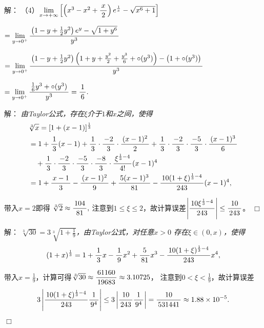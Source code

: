 \begin{frame}
	\linespread{1.5}
	\pause
	
	
	\small 解：
	（4）$\limx{+\infty}\left[\left(x^3-x^2+\df{x}2\right)e^{\frac1x}
	-\sqrt{x^6+1}\right]$
	
	\quad$=\lim\limits_{y\to0^+}\df{\left(1-y+\frac12y^2
	\right)e^y-\sqrt{1+y^6}}{y^3}$
	
	\quad$=\lim\limits_{y\to0^+}\df{\left(1-y+\frac12y^2
	\right)\left(1+y+\frac{y^2}2+\frac{y^3}6+\circ(y^3)\right)
	-\left(1+\circ(y^3)\right)}{y^3}$
	
	\quad$=\lim\limits_{y\to0^+}\df{\frac16y^3+\circ(y^3)}{y^3}=\df16.$
\end{frame}

\begin{frame}
	\linespread{1.5}
	\pause
	
	\bigskip
	
	\small 解：\it 
	由Taylor公式，存在$\xi$介于$1$和$x$之间，使得
	\begin{align*}
		&\sqrt[3]x=[1+(x-1)]^{\frac13}\\
		&=1+\df13(x-1)
		+\df13\cdot\df{-2}3\cdot\df{(x-1)^2}2
		+\df13\cdot\df{-2}3\cdot\df{-5}3\cdot\df{(x-1)^3}6\\
		&\quad+\df13\cdot\df{-2}3\cdot\df{-5}3\cdot\df{-8}3
		\cdot\df{\xi^{\frac13-4}}{4!}(x-1)^4\\
		&=1+\df{x-1}3-\df{(x-1)^2}9+\df{5(x-1)^3}{81}
		-\df{10(1+\xi)^{\frac13-4}}{243}(x-1)^4,
	\end{align*}
	
	\pause
	
	带入$x=2$即得
	$\sqrt[3]2\approx\df{104}{81},$
	注意到$1\leq\xi\leq 2$，故计算误差$\left|\df{10\xi^{\frac13-4}}{243}\right|
	\leq\df{10}{243}$。
	\hfill$\Box$
\end{frame}

\begin{frame}
	\linespread{1.5}
	\pause
	
	\bigskip
	
	\small 解：\it 
	$\sqrt[3]{30}=3\sqrt[3]{1+\frac19}$，由Taylor公式，对任意$x>0$
	存在$\xi\in(0,x)$，使得
	$$(1+x)^{\frac13}=1+\df13x-\df19x^2+\df5{81}x^3
	-\df{10(1+\xi)^{\frac13-4}}{243}x^4,$$
	
	\pause
	带入$x=\frac19$，计算可得$\sqrt[3]{30}\approx\df{61160}{19683}\approx
	3.10725$，
	注意到$0<\xi<\frac19$，故计算误差
	$$3\left|\df{10(1+\xi)^{\frac13-4}}{243}
	\df1{9^4}\right|\leq3\left|\df{10}{243}\df1{9^4}\right|=\df{10}{531441}
	\approx 1.88\times10^{-5}.$$
	\hfill$\Box$
\end{frame}


